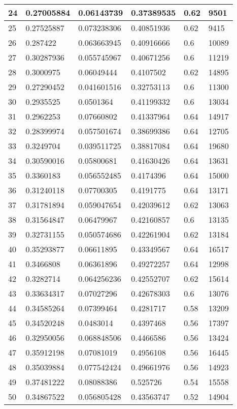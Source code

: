 \begin{longtable}{|l|l|l|l|l|l|}
24 & 0.27005884 & 0.06143739 & 0.37389535 & 0.62 & 9501 \\ \hline 
25 & 0.27525887 & 0.073238306 & 0.40851936 & 0.62 & 9415 \\ \hline 
26 & 0.287422 & 0.063663945 & 0.40916666 & 0.6 & 10089 \\ \hline 
27 & 0.30287936 & 0.055745967 & 0.40671256 & 0.6 & 11219 \\ \hline 
28 & 0.3000975 & 0.06049444 & 0.4107502 & 0.62 & 14895 \\ \hline 
29 & 0.27290452 & 0.041601516 & 0.32753113 & 0.6 & 11300 \\ \hline 
30 & 0.2935525 & 0.0501364 & 0.41199332 & 0.6 & 13034 \\ \hline 
31 & 0.2962253 & 0.07660802 & 0.41337964 & 0.64 & 14917 \\ \hline 
32 & 0.28399974 & 0.057501674 & 0.38699386 & 0.64 & 12705 \\ \hline 
33 & 0.3249704 & 0.039511725 & 0.38817084 & 0.64 & 19680 \\ \hline 
34 & 0.30590016 & 0.05800681 & 0.41630426 & 0.64 & 13631 \\ \hline 
35 & 0.3360183 & 0.056552485 & 0.4174396 & 0.64 & 15000 \\ \hline 
36 & 0.31240118 & 0.07700305 & 0.4191775 & 0.64 & 13171 \\ \hline 
37 & 0.31781894 & 0.059047654 & 0.42039612 & 0.62 & 13063 \\ \hline 
38 & 0.31564847 & 0.06479967 & 0.42160857 & 0.6 & 13135 \\ \hline 
39 & 0.32731155 & 0.050574686 & 0.42261904 & 0.62 & 13184 \\ \hline 
40 & 0.35293877 & 0.06611895 & 0.43349567 & 0.64 & 16517 \\ \hline 
41 & 0.3466808 & 0.06361896 & 0.49272257 & 0.64 & 12998 \\ \hline 
42 & 0.3282714 & 0.064256236 & 0.42552707 & 0.62 & 15614 \\ \hline 
43 & 0.33634317 & 0.07027296 & 0.42678303 & 0.6 & 13076 \\ \hline 
44 & 0.34585264 & 0.07399464 & 0.4281717 & 0.58 & 13209 \\ \hline 
45 & 0.34520248 & 0.0483014 & 0.4397468 & 0.56 & 17397 \\ \hline 
46 & 0.32950056 & 0.068848506 & 0.4466586 & 0.56 & 13424 \\ \hline 
47 & 0.35912198 & 0.07081019 & 0.4956108 & 0.56 & 16445 \\ \hline 
48 & 0.35039884 & 0.077542424 & 0.49661976 & 0.56 & 14923 \\ \hline 
49 & 0.37481222 & 0.08088386 & 0.525726 & 0.54 & 15558 \\ \hline 
50 & 0.34867522 & 0.056805428 & 0.43563747 & 0.52 & 14904 \\ \hline 
\end{longtable}